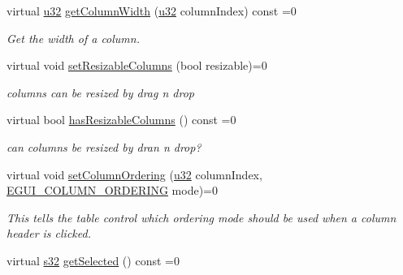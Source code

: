 \begin{DoxyCompactItemize}
virtual \hyperlink{namespaceirr_a0416a53257075833e7002efd0a18e804}{u32} \hyperlink{classirr_1_1gui_1_1IGUITable_ab41cd5d05657cfb5e45762f290629645}{get\+Column\+Width} (\hyperlink{namespaceirr_a0416a53257075833e7002efd0a18e804}{u32} column\+Index) const =0
\begin{DoxyCompactList}\small\item\em Get the width of a column. \end{DoxyCompactList}\item 
\mbox{\label{classirr_1_1gui_1_1IGUITable_a62da949732a2b870ccfb056aefcf823a}} 
virtual void \hyperlink{classirr_1_1gui_1_1IGUITable_a62da949732a2b870ccfb056aefcf823a}{set\+Resizable\+Columns} (bool resizable)=0
\begin{DoxyCompactList}\small\item\em columns can be resized by drag \textquotesingle{}n drop \end{DoxyCompactList}\item 
\mbox{\label{classirr_1_1gui_1_1IGUITable_a6cd99f12740e4fbd9bdc8a431879eec3}} 
virtual bool \hyperlink{classirr_1_1gui_1_1IGUITable_a6cd99f12740e4fbd9bdc8a431879eec3}{has\+Resizable\+Columns} () const =0
\begin{DoxyCompactList}\small\item\em can columns be resized by dran \textquotesingle{}n drop? \end{DoxyCompactList}\item 
virtual void \hyperlink{classirr_1_1gui_1_1IGUITable_a7d0ce2de316fb7f0e6164e8c196a819e}{set\+Column\+Ordering} (\hyperlink{namespaceirr_a0416a53257075833e7002efd0a18e804}{u32} column\+Index, \hyperlink{namespaceirr_1_1gui_a551e22458ae01a7eeaf87c0fbaaabf9a}{E\+G\+U\+I\+\_\+\+C\+O\+L\+U\+M\+N\+\_\+\+O\+R\+D\+E\+R\+I\+NG} mode)=0
\begin{DoxyCompactList}\small\item\em This tells the table control which ordering mode should be used when a column header is clicked. \end{DoxyCompactList}\item 
\mbox{\label{classirr_1_1gui_1_1IGUITable_acbad4aeda4e0135192a29fb93c19c67c}} 
virtual \hyperlink{namespaceirr_ac66849b7a6ed16e30ebede579f9b47c6}{s32} \hyperlink{classirr_1_1gui_1_1IGUITable_acbad4aeda4e0135192a29fb93c19c67c}{get\+Selected} () const =0

\end{DoxyCompactItemize}
